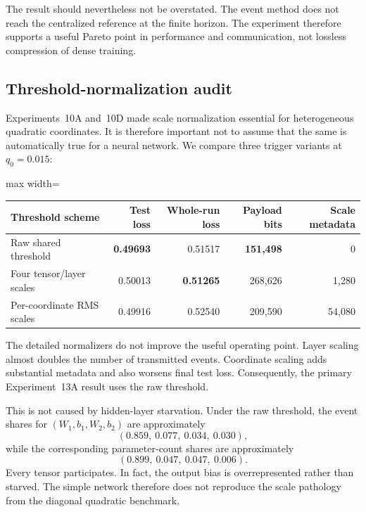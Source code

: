The result should nevertheless not be overstated. The event method does not reach the centralized reference at the finite horizon. The experiment therefore supports a useful Pareto point in performance and
communication, not lossless compression of dense training.

\subsection{Threshold-normalization audit}

Experiments~10A and~10D made scale normalization essential for heterogeneous quadratic coordinates. It is therefore important not to assume that the same is automatically true for a neural network. We compare three trigger variants at $q_0=0.015$:
\begin{center}
\begin{adjustbox}{max width=\textwidth}
\begin{tabular}{lrrrr}
\toprule
Threshold scheme & Test loss & Whole-run loss & Payload bits & Scale metadata\\
\midrule
Raw shared threshold & \textbf{0.49693} & 0.51517 & \textbf{151,498} & 0\\
Four tensor/layer scales & 0.50013 & \textbf{0.51265} & 268,626 & 1,280\\
Per-coordinate RMS scales & 0.49916 & 0.52540 & 209,590 & 54,080\\
\bottomrule
\end{tabular}
\end{adjustbox}
\end{center}
The detailed normalizers do not improve the useful operating point. Layer scaling almost doubles the number of transmitted events. Coordinate scaling adds substantial metadata and also worsens final test loss. Consequently, the primary Experiment~13A result uses the raw threshold.

This is not caused by hidden-layer starvation. Under the raw threshold, the event shares for $(W_1,b_1,W_2,b_2)$ are approximately
\begin{equation}
  (0.859,\ 0.077,\ 0.034,\ 0.030),
\end{equation}
while the corresponding parameter-count shares are approximately
\begin{equation}
  (0.899,\ 0.047,\ 0.047,\ 0.006).
\end{equation}
Every tensor participates. In fact, the output bias is overrepresented rather than starved. The simple network therefore does not reproduce the scale pathology from the diagonal quadratic benchmark.

